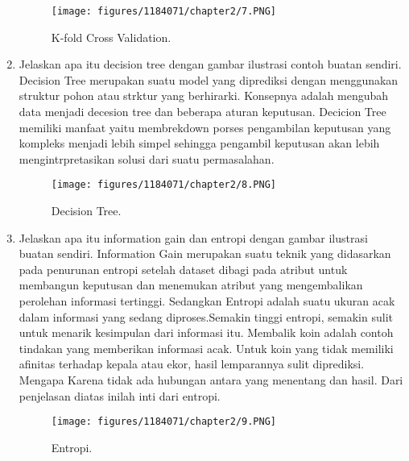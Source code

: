 \begin{enumerate}
	\begin{figure}[h]
	\centering
		\texttt{[image: figures/1184071/chapter2/7.PNG]}
		\caption{K-fold Cross Validation.}
	\end{figure}

	\item Jelaskan apa itu decision tree dengan gambar ilustrasi contoh buatan sendiri.
	\hfill\break
	Decision Tree merupakan suatu model yang diprediksi dengan menggunakan struktur pohon atau strktur yang berhirarki. Konsepnya adalah mengubah data menjadi decesion tree dan beberapa aturan keputusan. Decicion Tree memiliki manfaat yaitu membrekdown porses pengambilan keputusan yang kompleks menjadi lebih simpel sehingga pengambil keputusan akan lebih mengintrpretasikan solusi dari suatu permasalahan.

	\begin{figure}[h]
	\centering
		\texttt{[image: figures/1184071/chapter2/8.PNG]}
		\caption{Decision Tree.}
	\end{figure}

	\item Jelaskan apa itu information gain dan entropi dengan gambar ilustrasi buatan sendiri.
	\hfill\break
		Information Gain merupakan suatu teknik yang didasarkan pada penurunan entropi setelah dataset dibagi pada atribut untuk membangun keputusan dan menemukan atribut yang mengembalikan perolehan informasi tertinggi. Sedangkan Entropi adalah suatu ukuran acak dalam informasi yang sedang diproses.Semakin tinggi entropi, semakin sulit untuk menarik kesimpulan dari informasi itu. Membalik koin adalah contoh tindakan yang memberikan informasi acak. Untuk koin yang tidak memiliki afinitas terhadap kepala atau ekor, hasil lemparannya sulit diprediksi. Mengapa Karena tidak ada hubungan antara yang menentang dan hasil. Dari penjelasan diatas inilah inti dari entropi.
	\begin{figure}[h]
	\centering
		\texttt{[image: figures/1184071/chapter2/9.PNG]}
		\caption{Entropi.}
	\end{figure}
\end{enumerate}

